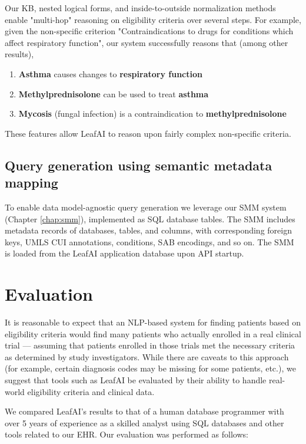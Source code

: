 \documentclass[../main.tex]{subfiles}
\begin{document}
Our KB, nested logical forms, and inside-to-outside normalization methods enable "multi-hop" reasoning on eligibility criteria over several steps. For example, given the non-specific criterion "Contraindications to drugs for conditions which affect respiratory function", our system successfully reasons that (among other results),

\begin{enumerate}
    \item \textbf{Asthma} causes changes to \textbf{respiratory function}
    \item \textbf{Methylprednisolone} can be used to treat \textbf{asthma}
    \item \textbf{Mycosis} (fungal infection) is a contraindication to \textbf{methylprednisolone}
\end{enumerate}

\noindent These features allow LeafAI to reason upon fairly complex non-specific criteria.

\subsection{Query generation using semantic metadata mapping}

To enable data model-agnostic query generation we leverage our SMM system (Chapter \ref{chap:smm}), implemented as SQL database tables. The SMM includes metadata records of databases, tables, and columns, with corresponding foreign keys, UMLS CUI annotations, conditions, SAB encodings, and so on. The SMM is loaded from the LeafAI application database upon API startup.

\section{Evaluation}

It is reasonable to expect that an NLP-based system for finding patients based on eligibility criteria would find many  patients who actually enrolled in a real clinical trial — assuming  that patients enrolled in those trials met the necessary criteria as determined by study investigators. While there are caveats to this approach (for example, certain diagnosis codes may be missing for some patients, etc.), we suggest that tools such as LeafAI be evaluated by their ability to handle real-world eligibility criteria and clinical data. 

We compared LeafAI's results to that of a human database programmer with over 5 years of experience as a skilled analyst using SQL databases and other tools related to our EHR. Our evaluation was performed as follows:
\end{document}
